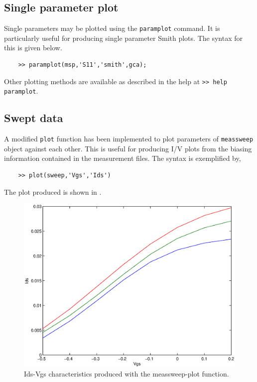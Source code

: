 \subsection{Single parameter plot}
Single parameters may be plotted using the \verb"paramplot"
command. It is particularly useful for producing single parameter
Smith plots. The syntax for this is given below.
\begin{small}
\begin{verbatim}
    >> paramplot(msp,'S11','smith',gca);
\end{verbatim}
\end{small}
Other plotting methods are available as described in the help at
\newline \verb">> help paramplot".

\subsection{Swept data}
A modified \verb"plot" function has been implemented to plot
parameters of \verb"meassweep" object against each other. This is
useful for producing I/V plots from the biasing information
contained in the measurement files. The syntax is exemplified by,
\begin{small}
\begin{verbatim}
    >> plot(sweep,'Vgs','Ids')
\end{verbatim}
\end{small}
The plot produced is shown in .

\begin{figure}[htbf]
    \centering
  \includegraphics[scale=0.6]{Figures/IdsVgs.eps}
  \caption{Ids-Vgs characteristics produced with the meassweep-plot function.}\label{fig:IdsVgs}
\end{figure}
